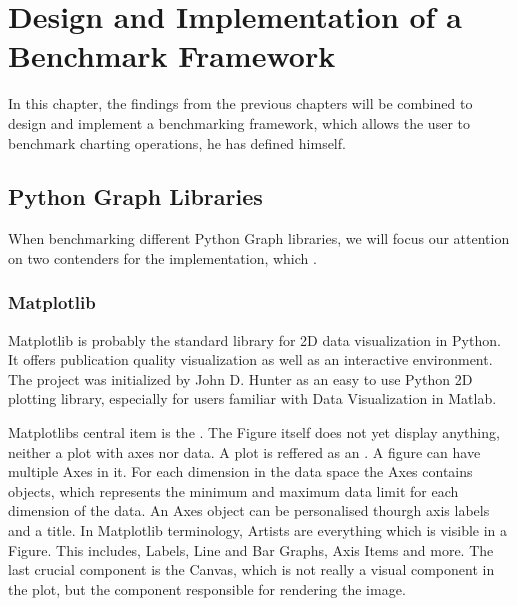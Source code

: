 

\chapter{Design and Implementation of a Benchmark Framework}
\label{ch:application}

In this chapter, the findings from the previous chapters will be combined
to design and implement a benchmarking framework, which allows the user to benchmark charting operations, he has defined himself. 





\section{Python Graph Libraries}
\label{sec:application:libraries}

When benchmarking different Python Graph libraries, we will focus our attention on two contenders for the implementation, which .

\subsection{Matplotlib}
\label{sec:application:libraries:matplotlib}

Matplotlib is probably the standard library for 2D data visualization in Python. It offers publication quality visualization as well as an interactive environment. The project was initialized by John D. Hunter as an easy to use Python 2D plotting library, especially for users familiar with Data Visualization in Matlab.
\cite{Matplotlib, MatplotlibHistory}

Matplotlibs central item is the . The Figure itself does not yet display anything, neither a plot with axes nor data. A plot is reffered as an . A figure can have multiple Axes in it. For each dimension in the data space the Axes contains  objects, which represents the minimum and maximum data limit for each dimension of the data. An Axes object can be personalised thourgh axis labels and a title. In Matplotlib terminology, Artists are everything which is visible in a Figure. This includes, Labels, Line and Bar Graphs, Axis Items and more. The last crucial component is the Canvas, which is not really a visual component in the plot, but the component responsible for rendering the image.

